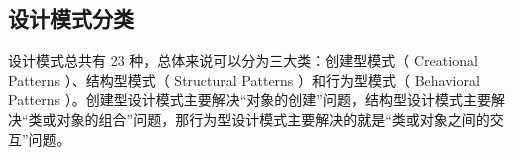 \documentclass[../../../interview-questions.tex]{subfiles}
\begin{document}
\subsection{设计模式分类}

设计模式总共有 23 种，总体来说可以分为三大类：创建型模式（ Creational Patterns ）、结构型模式（ Structural Patterns ）和行为型模式（ Behavioral Patterns ）。创建型设计模式主要解决“对象的创建”问题，结构型设计模式主要解决“类或对象的组合”问题，那行为型设计模式主要解决的就是“类或对象之间的交互”问题。
\end{document}
